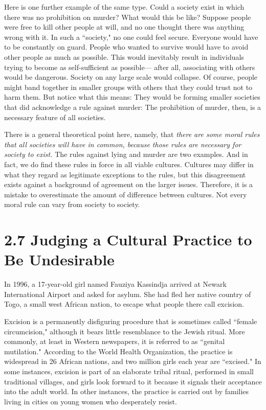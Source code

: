 Here  is  one  further  example  of  the  same  type.  Could  a  society  exist  in 
which  there  was  no  prohibition  on  murder?  What  would  this  be  like? 
Suppose people were free to kill other people at will, and no one thought 
there  was anything  wrong  with  it.  In  such a  ``society,"  no  one  could feel 
secure.  Everyone  would  have  to  be  constantly  on  guard.  People  who 
wanted to survive would have to avoid other people as much as 
possible.  This  would  inevitably  result  in  individuals  trying  to  become  as 
self-sufficient  as  possible— after  all,  associating  with  others  would  be 
dangerous. Society on any large scale would collapse. Of course, people 
might  band  together  in  smaller  groups  with  others  that  they  could  trust 
not  to  harm  them.  But  notice  what  this  means:  They  would  be  forming 
smaller  societies  that  did  acknowledge  a  rule  against  murder:  The 
prohibition of murder, then, is a necessary feature of all societies. 

There  is  a  general  theoretical  point  here,  namely,  that  \emph{there  are  some 
moral  rules  that  all  societies  will  have  in  common,  because  those  rules 
are necessary for society to exist.} The rules against lying and murder are 
two  examples.  And  in  fact,  we  do  find  these  rules  in  force  in  all  viable 
cultures. Cultures may differ in what they regard as legitimate exceptions 
to  the  rules,  but  this  disagreement  exists  against  a  background  of 
agreement on the larger issues. Therefore, it is a mistake to 
overestimate the amount of difference between cultures. Not every moral 
rule can vary from society to society. 
\section{2.7 Judging a Cultural Practice to Be Undesirable} 
In  1996,  a  17-year-old  girl  named  Fauziya Kassindja  arrived  at  Newark 
International  Airport  and  asked  for  asylum.  She  had  fled  her  native 
country  of  Togo,  a  small  west  African  nation,  to  escape  what  people 
there call excision. 

Excision is a permanently disfiguring procedure that is sometimes called 
``female  circumcision," although it bears little resemblance to the Jewish 
ritual.  More  commonly,  at  least  in Western newspapers,  it is  referred  to 
as  ``genital  mutilation."  According  to  the World  Health  Organization,  the 
practice  is  widespread  in  26  African  nations,  and  two  million  girls  each 
year  are  ``excised."  In  some  instances,  excision  is  part  of  an  elaborate 
tribal ritual, performed in small traditional villages, and girls look forward 
to  it  because  it  signals  their  acceptance  into  the  adult  world.  In  other 
instances, the practice is carried out by families living in cities on young 
women who desperately resist. 

